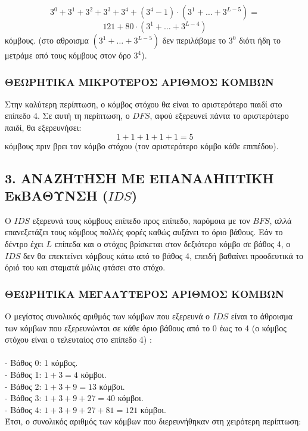 \documentclass{article}
\begin{document}
\[3^0 + 3^1+3^2+3^3+ 3^4 + (3^4-1)\cdot (3^1+\dots + 3^{L-5}) = \]
\[121 +80\cdot (3^1+\dots + 3^{L-4}) \]
κόμβους. (στο αθροισμα \((3^1+\dots + 3^{L-5})\) δεν περιλάβαμε το \(3^0\) διότι ήδη το μετράμε από τους κόμβους στον όρο \(3^4\)).

\subsubsection*{ΘΕΩΡΗΤΙΚΑ ΜΙΚΡΟΤΕΡΟΣ ΑΡΙΘΜΟΣ ΚΟΜΒΩΝ}
Στην καλύτερη περίπτωση, ο κόμβος στόχου θα είναι το αριστερότερο παιδί στο επίπεδο 4. Σε αυτή τη περίπτωση, ο \(DFS\), αφού εξερευνεί πάντα το αριστερότερο παιδί, θα εξερευνήσει:
\[1+1+1+1 + 1 = 5\]
κόμβους πριν βρει τον κόμβο στόχου (τον αριστερότερο κόμβο κάθε επιπέδου).

\subsection*{3. ΑΝΑΖΗΤΗΣΗ ΜΕ ΕΠΑΝΑΛΗΠΤΙΚΗ ΕκΒΑΘΥΝΣΗ (\(IDS\))}

O \(IDS\) εξερευνά τους κόμβους επίπεδο προς επίπεδο, παρόμοια με τον \(BFS\), αλλά επανεξετάζει τους κόμβους πολλές φορές καθώς αυξάνει το όριο βάθους. Εάν το δέντρο έχει \( L \) επίπεδα και ο στόχος βρίσκεται στον δεξιότερο κόμβο σε βάθος 4, ο \(IDS\) δεν θα επεκτείνει κόμβους κάτω από το βάθος 4, επειδή βαθαίνει προοδευτικά το όριό του και σταματά μόλις φτάσει στο στόχο.

\subsubsection*{ΘΕΩΡΗΤΙΚΑ ΜΕΓΑΛΥΤΕΡΟΣ ΑΡΙΘΜΟΣ ΚΟΜΒΩΝ}

Ο μεγίστος συνολικός αριθμός των κόμβων που εξερευνά ο \(IDS\) είναι το άθροισμα των κόμβων που εξερευνώνται σε κάθε όριο βάθους από το 0 έως το 4 (ο κόμβος στόχου είναι ο τελευταίος στο επίπεδο 4) : \\
\\
- Βάθος 0: 1 κόμβος. \\
- Βάθος 1: \( 1 + 3 = 4 \) κόμβοι. \\
- Βάθος 2: \( 1 + 3 + 9 = 13 \) κόμβοι. \\
- Βάθος 3: \( 1 + 3 + 9 + 27 = 40 \) κόμβοι. \\
- Βάθος 4: \( 1 + 3 + 9 + 27 + 81 = 121 \) κόμβοι. \\

Έτσι, ο συνολικός αριθμός των κόμβων που διερευνήθηκαν στη χειρότερη περίπτωση:
\end{document}

